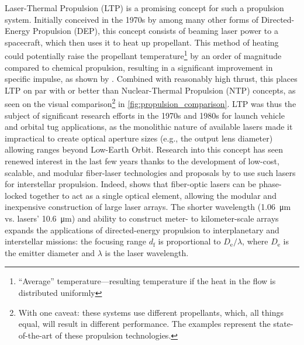    Laser-Thermal Propulsion (LTP) is a promising concept for such a propulsion system. Initially conceived in the 1970s by \textcite{kantrowitzRelevanceSpace1971} among many other forms of Directed-Energy Propulsion (DEP), this concept consists of beaming laser power to a spacecraft, which then uses it to heat up propellant. This method of heating could potentially raise the propellant temperature\footnote{``Average'' temperature---resulting temperature if the heat in the flow is distributed uniformly} by an order of magnitude compared to chemical propulsion, resulting in a significant improvement in specific impulse, as shown by \textcite{noredApplicationHighPower1976}. Combined with reasonably high thrust, this places LTP on par with or better than Nuclear-Thermal Propulsion (NTP) concepts, as seen on the visual comparison\footnote{With one caveat: these systems use different propellants, which, all things equal, will result in different performance. The examples represent the state-of-the-art of these propulsion technologies.} in \autoref{fig:propulsion_comparison}. LTP was thus the subject of significant research efforts in the 1970s and 1980s for launch vehicle and orbital tug applications, as the monolithic nature of available  lasers made it impractical to create optical aperture sizes (e.g., the output lens diameter) allowing ranges beyond Low-Earth Orbit. Research into this concept has seen renewed interest in the last few years thanks to the development of low-cost, scalable, and modular fiber-laser technologies and proposals by \textcite{lubinRoadmapInterstellarFlight2016a} to use such lasers for interstellar propulsion. Indeed, \citeauthor{lubinRoadmapInterstellarFlight2016a} shows that fiber-optic lasers can be phase-locked together to act as a single optical element, allowing the modular and inexpensive construction of large laser arrays. The shorter wavelength (\qty{1.06}{\um} vs.  lasers' \qty{10.6}{\um}) and ability to construct meter- to kilometer-scale arrays expands the applications of directed-energy propulsion to interplanetary and interstellar missions: the focusing range $d_\mathrm{f}$ is proportional to $D_\mathrm{e}/\lambda$, where $D_\mathrm{e}$ is the emitter diameter and $\lambda$ is the laser wavelength.

